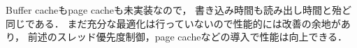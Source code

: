 \documentclass{ieicej}
\begin{document}
Buffer cacheもpage cacheも未実装なので，
書き込み時間も読み出し時間と殆ど同じである．
まだ充分な最適化は行っていないので性能的には改善の余地があり，
前述のスレッド優先度制御，page cacheなどの導入で性能は向上できる．







\end{document}
